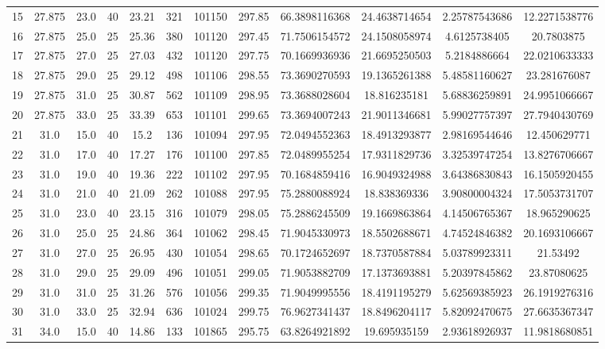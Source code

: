 \begin{table}[H]
\begin{center}
\begin{tabular}{|cccccccccccc|}
	15 & 27.875 & 23.0 & 40 & 23.21 & 321 & 101150 & 297.85 & 66.3898116368 & 24.4638714654 & 2.25787543686 & 12.2271538776\\
	16 & 27.875 & 25.0 & 25 & 25.36 & 380 & 101120 & 297.45 & 71.7506154572 & 24.1508058974 & 4.6125738405 & 20.7803875\\
	17 & 27.875 & 27.0 & 25 & 27.03 & 432 & 101120 & 297.75 & 70.1669936936 & 21.6695250503 & 5.2184886664 & 22.0210633333\\
	18 & 27.875 & 29.0 & 25 & 29.12 & 498 & 101106 & 298.55 & 73.3690270593 & 19.1365261388 & 5.48581160627 & 23.281676087\\
	19 & 27.875 & 31.0 & 25 & 30.87 & 562 & 101109 & 298.95 & 73.3688028604 & 18.816235181 & 5.68836259891 & 24.9951066667\\
	20 & 27.875 & 33.0 & 25 & 33.39 & 653 & 101101 & 299.65 & 73.3694007243 & 21.9011346681 & 5.99027757397 & 27.7940430769\\
	21 & 31.0 & 15.0 & 40 & 15.2 & 136 & 101094 & 297.95 & 72.0494552363 & 18.4913293877 & 2.98169544646 & 12.450629771\\
	22 & 31.0 & 17.0 & 40 & 17.27 & 176 & 101100 & 297.85 & 72.0489955254 & 17.9311829736 & 3.32539747254 & 13.8276706667\\
	23 & 31.0 & 19.0 & 40 & 19.36 & 222 & 101102 & 297.95 & 70.1684859416 & 16.9049324988 & 3.64386830843 & 16.1505920455\\
	24 & 31.0 & 21.0 & 40 & 21.09 & 262 & 101088 & 297.95 & 75.2880088924 & 18.838369336 & 3.90800004324 & 17.5053731707\\
	25 & 31.0 & 23.0 & 40 & 23.15 & 316 & 101079 & 298.05 & 75.2886245509 & 19.1669863864 & 4.14506765367 & 18.965290625\\
	26 & 31.0 & 25.0 & 25 & 24.86 & 364 & 101062 & 298.45 & 71.9045330973 & 18.5502688671 & 4.74524846382 & 20.1693106667\\
	27 & 31.0 & 27.0 & 25 & 26.95 & 430 & 101054 & 298.65 & 70.1724652697 & 18.7370587884 & 5.03789923311 & 21.53492\\
	28 & 31.0 & 29.0 & 25 & 29.09 & 496 & 101051 & 299.05 & 71.9053882709 & 17.1373693881 & 5.20397845862 & 23.87080625\\
	29 & 31.0 & 31.0 & 25 & 31.26 & 576 & 101056 & 299.35 & 71.9049995556 & 18.4191195279 & 5.62569385923 & 26.1919276316\\
	30 & 31.0 & 33.0 & 25 & 32.94 & 636 & 101024 & 299.75 & 76.9627341437 & 18.8496204117 & 5.82092470675 & 27.6635367347\\
	31 & 34.0 & 15.0 & 40 & 14.86 & 133 & 101865 & 295.75 & 63.8264921892 & 19.695935159 & 2.93618926937 & 11.9818680851\\

\end{tabular}
\end{center}
\end{table}
